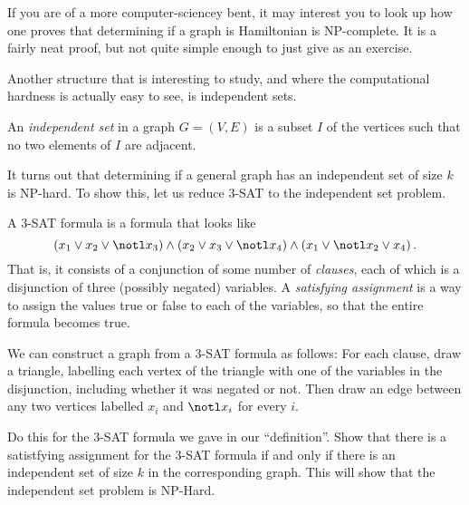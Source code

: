 \documentclass[nobib]{tufte-handout}
\begin{document}
If you are of a more computer-sciencey bent, it may interest you to look up how one proves that determining if a graph is Hamiltonian is NP-complete. It is a fairly neat proof, but not quite simple enough to just give as an exercise.

Another structure that is interesting to study, and where the computational hardness is actually easy to see, is independent sets.

\begin{definition}
  An \emph{independent set} in a graph $G = (V,E)$ is a subset $I$ of the vertices such that no two elements of $I$ are adjacent.
\end{definition}

It turns out that determining if a general graph has an independent set of size $k$ is NP-hard. To show this, let us reduce $3$-SAT to the independent set problem.

\begin{definition}
  A $3$-SAT formula is a formula that looks like
  $$\left(x_1 \vee x_2 \vee \notl x_3\right) \wedge \left(x_2 \vee x_3 \vee \notl x_4\right) \wedge \left(x_1 \vee \notl x_2 \vee x_4\right).$$
  That is, it consists of a conjunction of some number of \emph{clauses}, each of which is a disjunction of three (possibly negated) variables. A \emph{satisfying assignment} is a way to assign the values true or false to each of the variables, so that the entire formula becomes true.
\end{definition}

\begin{xca}
  We can construct a graph from a $3$-SAT formula as follows: For each clause, draw a triangle, labelling each vertex of the triangle with one of the variables in the disjunction, including whether it was negated or not. Then draw an edge between any two vertices labelled $x_i$ and $\notl x_i$ for every $i$.

  Do this for the $3$-SAT formula we gave in our ``definition''. Show that there is a satistfying assignment for the $3$-SAT formula if and only if there is an independent set of size $k$ in the corresponding graph. This will show that the independent set problem is NP-Hard.
\end{xca}
\end{document}
